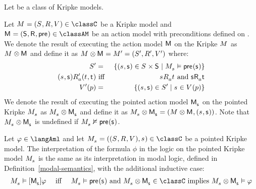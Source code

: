 \begin{definition}
Let \classC{} be a class of Kripke models.

Let $\modelAndTuple \in \classC$ be a Kripke model and $\actionModelAndTuple \in \classAM$ be an action model with preconditions defined on \langAml{}.
We denote the result of executing the action model $\actionModel$ on the Kripke $\model$ as $\model \exec \actionModel$ and define it as $\model \exec \actionModel = \modelAndTuple[\prime]$ where:
\begin{eqnarray*}
    \states[\prime] &=& \{(\stateS, \actionStateS) \in \states \times \actionStates \mid \pointedModel{\stateS} \entails \actionPrecondition(\actionStateS)\}\\
    (\stateS, \actionStateS) \accessibility[\prime]{\agentA} (\stateT, \actionStateT) &\text{ iff }& \stateS \accessibility{\agentA} \stateT \text{ and } \actionStateS \actionAccessibility{\agentA} \actionStateT\\
    \valuation[\prime](\atomP) &=& \{(\stateS, \actionStateS) \in \states[\prime] \mid \stateS \in \valuation(\atomP)\}
\end{eqnarray*}
We denote the result of executing the pointed action model $\pointedActionModel{\actionStateS}$ on the pointed Kripke $\pointedModel{\stateS}$ as $\pointedModel{\stateS} \exec \pointedActionModel{\actionStateS}$ and define it as $\pointedModel{\stateS} \exec \pointedActionModel{\actionStateS} = (\model \exec \actionModel, (\stateS, \actionStateS))$. Note that $\pointedModel{\stateS} \exec \pointedActionModel{\actionStateS}$ is undefined if $\pointedModel{\stateS} \nentails \actionPrecondition(\actionStateS)$.

Let $\phi \in \langAml$ and let $\pointedModelAndTuple{\stateS} \in \classC$ be a pointed Kripke model.
The interpretation of the formula $\phi$ in the logic \logicAmlS{} on the pointed Kripke model $\pointedModel{\stateS}$ is the same as its interpretation in modal logic, defined in Definition~\ref{modal-semantics}, with the additional inductive case:
$$
\begin{array}{lcl}
    \pointedModel{\stateS} \entails \actionA{\pointedActionModel{\actionStateS}} \phi & \text { iff } & \pointedModel{\stateS} \entails \actionPrecondition(\actionStateS) \text{ and } \pointedModel{\stateS} \exec \pointedActionModel{\actionStateS} \in \classC \text{ implies } \pointedModel{\stateS} \exec \pointedActionModel{\actionStateS} \entails \phi
\end{array}
$$
\end{definition}

